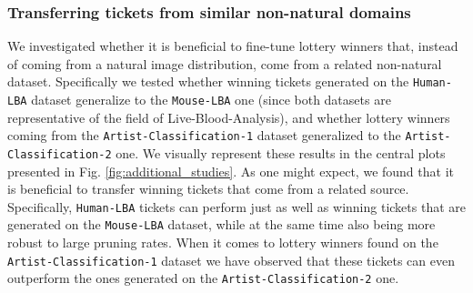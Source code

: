 

\subsubsection{Transferring tickets from similar non-natural domains}
We investigated whether it is beneficial to fine-tune lottery winners that, instead of coming from a natural image distribution, come from a related non-natural dataset. Specifically we tested whether winning tickets generated on the \texttt{Human-LBA} dataset generalize to the \texttt{Mouse-LBA} one (since both datasets are representative of the field of Live-Blood-Analysis), and whether lottery winners coming from the \texttt{Artist-Classification-1} dataset generalized to the \texttt{Artist-Classification-2} one. We visually represent these results in the central plots presented in Fig. \ref{fig:additional_studies}. As one might expect, we found that it is beneficial to transfer winning tickets that come from a related source. Specifically, \texttt{Human-LBA} tickets can perform just as well as winning tickets that are generated on the \texttt{Mouse-LBA} dataset, while at the same time also being more robust to large pruning rates. When it comes to lottery winners found on the \texttt{Artist-Classification-1} dataset we have observed that these tickets can even outperform the ones generated on the \texttt{Artist-Classification-2} one.





